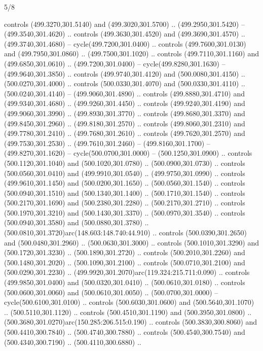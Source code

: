\begin{flagdescription}{5/8}
\begin{scope}[xshift=0.5\flaglength,yshift=0.5\flagwidth,scale=\flagwidth/475.63]
\begin{scope}[y=0.8pt, x=0.8pt, yscale=-1, xscale=1,shift={(-450,-300)}]
\begin{scope}[cm={{1.0,0.0,0.0,1.0,(-0.0002,0.12556)}},cm={{1.0,0.0,0.0,1.0,(0.00179,0.0)}}]
\begin{scope}[cm={{1.11592,0.0,0.0,1.11592,(-106.89933,-41.77764)}}]
\begin{scope}[draw=black,fill=cfff]
\begin{scope}[fill=black]
  controls (499.3270,301.5140) and (499.3020,301.5700) .. (499.2950,301.5420) --
  (499.3540,301.4620) .. controls (499.3630,301.4520) and (499.3690,301.4570) ..
  (499.3740,301.4680) -- cycle(499.7200,301.0400) .. controls
  (499.7600,301.0130) and (499.7950,301.0860) .. (499.7500,301.1020) .. controls
  (499.7110,301.1160) and (499.6850,301.0610) .. (499.7200,301.0400) --
  cycle(499.8280,301.1630) -- (499.9640,301.3850) .. controls
  (499.9740,301.4120) and (500.0080,301.4150) .. (500.0270,301.4000) .. controls
  (500.0330,301.4070) and (500.0330,301.4110) .. (500.0240,301.4140) --
  (499.9060,301.4890) .. controls (499.8880,301.4710) and (499.9340,301.4680) ..
  (499.9260,301.4450) .. controls (499.9240,301.4190) and (499.9060,301.3990) ..
  (499.8930,301.3770) .. controls (499.8680,301.3370) and (499.8450,301.2960) ..
  (499.8180,301.2570) .. controls (499.8060,301.2310) and (499.7780,301.2410) ..
  (499.7680,301.2610) .. controls (499.7620,301.2570) and (499.7530,301.2530) ..
  (499.7610,301.2460) -- (499.8160,301.1700) -- (499.8270,301.1620) --
  cycle(500.0700,301.0000) -- (500.1250,301.0900) .. controls
  (500.1120,301.1040) and (500.1020,301.0780) .. (500.0900,301.0730) .. controls
  (500.0560,301.0410) and (499.9910,301.0540) .. (499.9750,301.0990) .. controls
  (499.9610,301.1450) and (500.0200,301.1650) .. (500.0560,301.1540) .. controls
  (500.0940,301.1510) and (500.1340,301.1400) .. (500.1710,301.1540) .. controls
  (500.2170,301.1690) and (500.2380,301.2280) .. (500.2170,301.2710) .. controls
  (500.1970,301.3210) and (500.1430,301.3370) .. (500.0970,301.3540) .. controls
  (500.0940,301.3580) and (500.0880,301.3780) ..
  (500.0810,301.3720)arc(148.603:148.740:44.910) .. controls (500.0390,301.2650)
  and (500.0480,301.2960) .. (500.0630,301.3000) .. controls (500.1010,301.3290)
  and (500.1720,301.3230) .. (500.1890,301.2720) .. controls (500.2010,301.2260)
  and (500.1480,301.2020) .. (500.1090,301.2100) .. controls (500.0710,301.2100)
  and (500.0290,301.2230) .. (499.9920,301.2070)arc(119.324:215.711:0.090) ..
  controls (499.9850,301.0400) and (500.0320,301.0410) .. (500.0610,301.0180) ..
  controls (500.0600,301.0060) and (500.0610,301.0050) .. (500.0700,301.0000) --
  cycle(500.6100,301.0100) .. controls (500.6030,301.0600) and
  (500.5640,301.1070) .. (500.5110,301.1120) .. controls (500.4510,301.1190) and
  (500.3950,301.0800) .. (500.3680,301.0270)arc(150.285:206.515:0.190) ..
  controls (500.3830,300.8060) and (500.4410,300.7840) .. (500.4740,300.7880) ..
  controls (500.4540,300.7540) and (500.4340,300.7190) .. (500.4110,300.6880) ..

\end{scope}
\end{scope}
\end{scope}
\end{scope}
\end{scope}
\end{scope}
\end{flagdescription}
